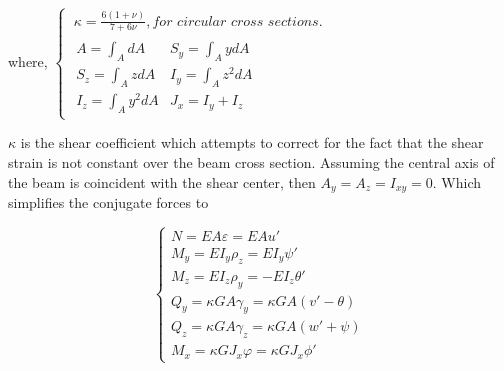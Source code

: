 \begin{center}where, $ \left\{\begin{array}{l}
\ \kappa=\frac{6(1+\nu)}{7+6\nu}, \textit{for circular cross sections.}\\
\begin{array}{ll}
A=\int_AdA&S_y=\int_A ydA\\
S_z=\int_AzdA&I_y=\int_Az^2dA\\
I_z=\int_Ay^2dA&J_x=I_y+I_z
\end{array}
\end{array}\right. $\\\end{center}
$ \kappa $ is the shear coefficient which attempts to correct for the fact that the shear strain is not constant over the beam cross section. Assuming the central axis of the beam is coincident with the shear center, then $ A_y=A_z=I_{xy}=0 $. Which simplifies the conjugate forces to


\begin{equation}\label{eq:generalizedForcesSimplified}
\left\{\begin{array}{l}
N=EA\varepsilon=EAu'\\
M_y=EI_y\rho_z=EI_y\psi'\\
M_z=EI_z\rho_y=-EI_z\theta'\\
Q_y=\kappa G A\gamma_y=\kappa G A(v'-\theta)\\
Q_z=\kappa G A\gamma_z=\kappa G A(w'+\psi)\\
M_x=\kappa G J_x\varphi=\kappa G J_x\phi'
\end{array}\right.
\end{equation}

